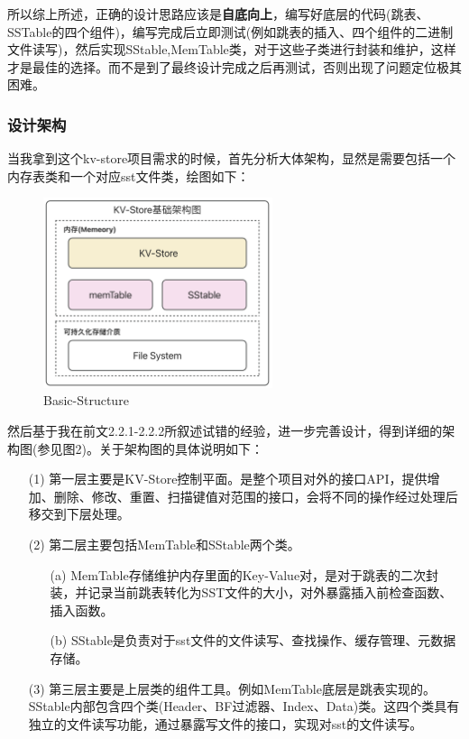 \documentclass[fontset=windows]{article}
\begin{document}
所以综上所述，正确的设计思路应该是\textbf{自底向上}，编写好底层的代码(跳表、SSTable的四个组件)，编写完成后立即测试(例如跳表的插入、四个组件的二进制文件读写)，然后实现SStable,MemTable类，对于这些子类进行封装和维护，这样才是最佳的选择。而不是到了最终设计完成之后再测试，否则出现了问题定位极其困难。

\subsubsection{设计架构}
当我拿到这个kv-store项目需求的时候，首先分析大体架构，显然是需要包括一个内存表类和一个对应sst文件类，绘图如下：



\begin{figure}[h!]
  \centering
  \includegraphics[width=0.60\textwidth]{Image/Basic-Structure.png}
  \caption{Basic-Structure}
  \label{fig:Basic-Structure}
\end{figure}


然后基于我在前文2.2.1-2.2.2所叙述试错的经验，进一步完善设计，得到详细的架构图(参见图2)。关于架构图的具体说明如下：

\begin{itemize}
    \item [(1)] 
    第一层主要是KV-Store控制平面。是整个项目对外的接口API，提供增加、删除、修改、重置、扫描键值对范围的接口，会将不同的操作经过处理后移交到下层处理。
    \item [(2)] 
    第二层主要包括MemTable和SStable两个类。
    \begin{itemize}
    \item [(a)] 
    MemTable存储维护内存里面的Key-Value对，是对于跳表的二次封装，并记录当前跳表转化为SST文件的大小，对外暴露插入前检查函数、插入函数。
    \item [(b)]
    SStable是负责对于sst文件的文件读写、查找操作、缓存管理、元数据存储。
    \end{itemize}
    \item [(3)] 
    第三层主要是上层类的组件工具。例如MemTable底层是跳表实现的。SStable内部包含四个类(Header、BF过滤器、Index、Data)类。这四个类具有独立的文件读写功能，通过暴露写文件的接口，实现对sst的文件读写。
\end{itemize}
\end{document}
